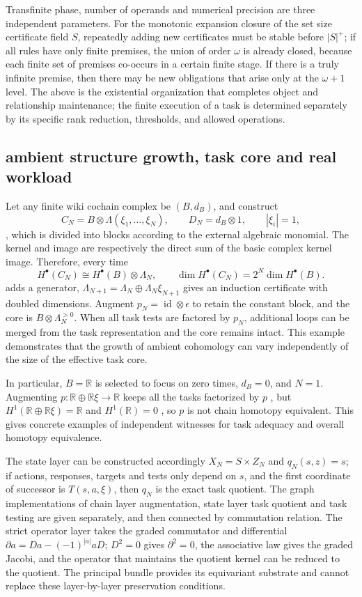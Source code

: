 \documentclass[11pt,a4paper]{article}
\theoremstyle{plain}
\theoremstyle{definition}
\theoremstyle{remark}
\begin{document}
\begin{CJK*}
Transfinite phase, number of operands and numerical precision are three independent parameters. For the monotonic expansion closure of the set size certificate field $S$, repeatedly adding new certificates must be stable before $|S|^+$; if all rules have only finite premises, the union of order $\omega$ is already closed, because each finite set of premises co-occurs in a certain finite stage. If there is a truly infinite premise, then there may be new obligations that arise only at the $\omega+1$ level. The above is the existential organization that completes object and relationship maintenance; the finite execution of a task is determined separately by its specific rank reduction, thresholds, and allowed operations.

\subsection { ambient structure growth, task core and real workload }

Let any finite wiki cochain complex be $(B,d_B)$, and construct \[
 C_N=B\otimes\Lambda(\xi_1,\ldots,\xi_N),\qquad
 D_N=d_B\otimes1,\qquad |\xi_i|=1,
\], which is divided into blocks according to the external algebraic monomial. The kernel and image are respectively the direct sum of the basic complex kernel image. Therefore, every time \[
 H^\bullet(C_N)\cong H^\bullet(B)\otimes\Lambda_N,
 \qquad \dim H^\bullet(C_N)=2^N\dim H^\bullet(B).
\] adds a generator, $\Lambda_{N+1}=\Lambda_N\oplus\Lambda_N\xi_{N+1}$ gives an induction certificate with doubled dimensions. Augment $p_N=\operatorname{id}\otimes\epsilon$ to retain the constant block, and the core is $B\otimes\Lambda_N^{>0}$. When all task tests are factored by $p_N$, additional loops can be merged from the task representation and the core remains intact. This example demonstrates that the growth of ambient cohomology can vary independently of the size of the effective task core.

In particular, $B=\mathbb R$ is selected to focus on zero times, $d_B=0$, and $N=1$. Augmenting $p:\mathbb R\oplus\mathbb R\xi\to\mathbb R$ keeps all the tasks factorized by $p$ , but $H^1(\mathbb R\oplus\mathbb R\xi)=\mathbb R$ and $H^1(\mathbb R)=0$ , so $p$ is not chain homotopy equivalent. This gives concrete examples of independent witnesses for task adequacy and overall homotopy equivalence.

The state layer can be constructed accordingly $X_N=S\times Z_N$ and $q_N(s,z)=s$; if actions, responses, targets and tests only depend on $s$, and the first coordinate of successor is $T(s,a,\xi)$, then $q_N$ is the exact task quotient. The graph implementations of chain layer augmentation, state layer task quotient and task testing are given separately, and then connected by commutation relation. The strict operator layer takes the graded commutator and differential $\partial a=Da-(-1)^{|a|}aD$; $D^2=0$ gives $\partial^2=0$, the associative law gives the graded Jacobi, and the operator that maintains the quotient kernel can be reduced to the quotient. The principal bundle provides its equivariant substrate and cannot replace these layer-by-layer preservation conditions.


\end{CJK*}
\end{document}
